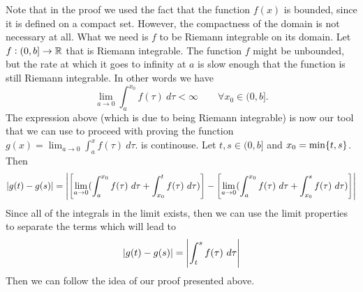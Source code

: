 \begin{remark}
	Note that in the proof we used the fact that the function $ f(x) $ is bounded, since it is defined on a compact set. However, the compactness of the domain is not necessary at all. What we need is $ f $ to be Riemann integrable on its domain. Let $ f:(0,b]\to\mathbb{R} $ that is Riemann integrable. The function $ f $ might be unbounded, but the rate at which it goes to infinity at $ a $ is slow enough that the function is still Riemann integrable. In other words we have
	\[ \lim_{a \to 0} \int_{a}^{x_0}f(\tau)\ d\tau < \infty \qquad \forall x_0 \in (0,b]. \]
	The expression above (which is due to being Riemann integrable) is now our tool that we can use to proceed with proving the function $ g(x) = \lim_{a\to0}\int_{a}^{x} f(\tau) \ d\tau. $ is continouse. Let $  t,s \in (0,b] $ and $ x_0 = \min\{t,s\} $. Then 
	\[ \abs{g(t) - g(s)} = \Abs{\left[\lim_{a\to 0}(\int_{a}^{x_0} f(\tau) \ d\tau + \int_{x_0}^{t} f(\tau)\ d\tau)\right] - \left[\lim_{a\to 0}(\int_{a}^{x_0} f(\tau) \ d\tau + \int_{x_0}^{s} f(\tau)\ d\tau)\right]} \]
	Since all of the integrals in the limit exists, then we can use the limit properties to separate the terms which will lead to 
	\[ \abs{g(t) - g(s)} = \Abs{\int_{t}^{s} f(\tau)\ d\tau} \]
	Then we can follow the idea of our proof presented above.
\end{remark}